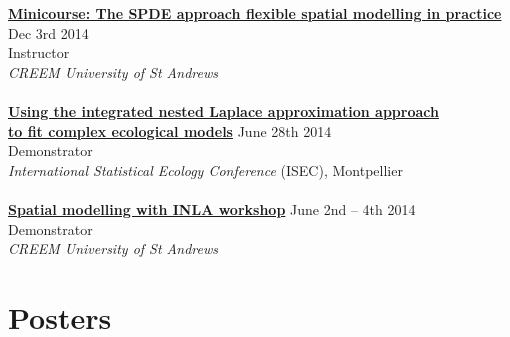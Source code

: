 \documentclass[10pt,letter]{res}
\begin{document}
\begin{resume}
 {\textbf{\href{http://creem2.st-andrews.ac.uk/past-seminars/}{Minicourse: The SPDE approach flexible spatial modelling in practice}}} \hfill Dec 3rd  2014\\
 Instructor\\
 {\sl CREEM University of St Andrews}\\ 
 \hdashrule[0.5ex]{4cm}{1pt}{1pt}\\
{\href{http://www.r-inla.org/events/inlacourseatisec2014}{\textbf {Using the integrated nested Laplace approximation approach}}} \\ {\href{http://www.r-inla.org/events/inlacourseatisec2014}{\textbf{to fit complex ecological models}}}  \hfill June 28th 2014\\
 Demonstrator\\
 {\sl International Statistical Ecology Conference} (ISEC), Montpellier\\ 
\hdashrule[0.5ex]{4cm}{1pt}{1pt}\\
{\textbf{\href{http://creem2.st-andrews.ac.uk/workshops/past-workshops/}{Spatial modelling with INLA workshop}}} \hfill June 2nd – 4th  2014\\
 Demonstrator\\
 {\sl CREEM University of St Andrews}\\ 
 
 



 \vspace{-1mm}

\section{Posters}
\vspace{1mm}


\end{resume}
\end{document}
